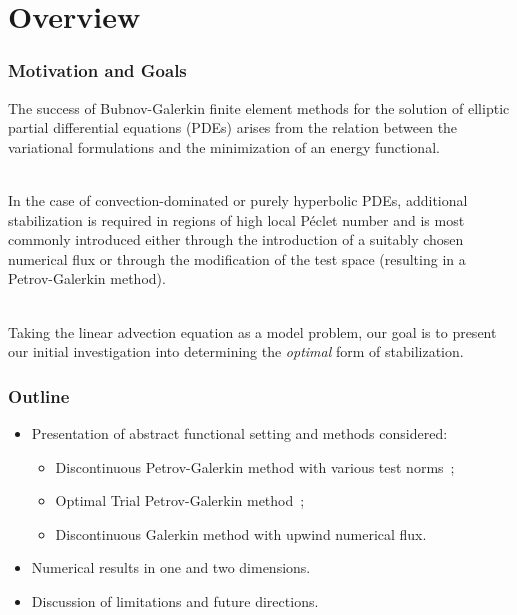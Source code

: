 \section{Overview}

\begin{frame}
\frametitle{Motivation and Goals}

The success of Bubnov-Galerkin finite element methods for the solution of elliptic partial differential equations (PDEs) arises from the relation between the variational formulations and the minimization of an energy functional.
\\~

In the case of convection-dominated or purely hyperbolic PDEs, additional stabilization is required in regions of high local P\'eclet number and is most commonly introduced either through the introduction of a suitably chosen numerical flux or through the modification of the test space (resulting in a Petrov-Galerkin method).
\\~

Taking the linear advection equation as a model problem, our goal is to present our initial investigation into determining the \emph{optimal} form of stabilization.

\end{frame}

\begin{frame}
\frametitle{Outline}

\begin{itemize}
\item Presentation of abstract functional setting and methods considered:
\begin{itemize}
\item Discontinuous Petrov-Galerkin method with various test norms~\cite{Demkowicz2011};
\item Optimal Trial Petrov-Galerkin method~\cite{Brunken2018};
\item Discontinuous Galerkin method with upwind numerical flux.
\end{itemize}
\item Numerical results in one and two dimensions.
\item Discussion of limitations and future directions.
\end{itemize}

\end{frame}